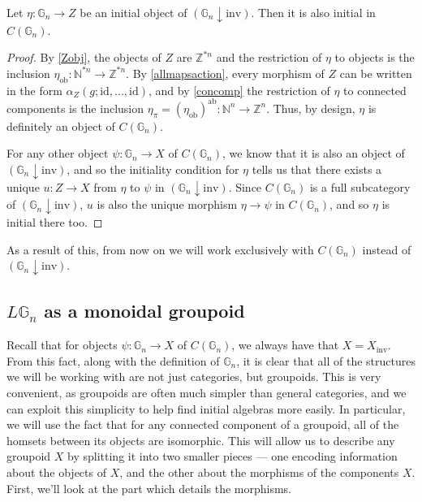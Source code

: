 \begin{lem}\label{initialab} Let $\eta : \mathbb{G}_n \to Z$ be an initial object of $(\mathbb{G}_n \downarrow \mathrm{inv})$. Then it is also initial in $C(\mathbb{G}_n)$.
\end{lem}
\begin{proof}
By \cref{Zobj}, the objects of $Z$ are $\mathbb{Z}^{\ast n}$ and the restriction of $\eta$ to objects is the inclusion $\eta_{\mathrm{ob}} : \mathbb{N}^{\ast n} \to \mathbb{Z}^{\ast n}$. By \cref{allmapsaction}, every morphism of $Z$ can be written in the form $\alpha_Z(g; \mathrm{id}, ..., \mathrm{id})$, and by \ref{concomp} the restriction of $\eta$ to connected components is the inclusion $\eta_\pi = (\eta_{\mathrm{ob}})^{\mathrm{ab}} : \mathbb{N}^n \to \mathbb{Z}^n$. Thus, by design, $\eta$ is definitely an object of $C(\mathbb{G}_n)$. 

For any other object $\psi: \mathbb{G}_n \to X$ of $C(\mathbb{G}_n)$, we know that it is also an object of $(\mathbb{G}_n \downarrow \mathrm{inv})$, and so the initiality condition for $\eta$ tells us that there exists a unique $u : Z \to X$ from $\eta$ to $\psi$ in $(\mathbb{G}_n \downarrow \mathrm{inv})$. Since $C(\mathbb{G}_n)$ is a full subcategory of $(\mathbb{G}_n \downarrow \mathrm{inv})$, $u$ is also the unique morphism $\eta \to \psi$ in $C(\mathbb{G}_n)$, and so $\eta$ is initial there too.
\end{proof}

As a result of this, from now on we will work exclusively with $C(\mathbb{G}_n)$ instead of $(\mathbb{G}_n \downarrow \mathrm{inv})$.

\subsection{$L\mathbb{G}_n$ as a monoidal groupoid}

Recall that for objects $\psi: \mathbb{G}_n \to X$ of $C(\mathbb{G}_n)$, we always have that $X = X_{\mathrm{inv}}$. From this fact, along with the definition of $\mathbb{G}_n$, it is clear that all of the structures we will be working with are not just categories, but groupoids. This is very convenient, as groupoids are often much simpler than general categories, and we can exploit this simplicity to help find initial algebras more easily. In particular, we will use the fact that for any connected component of a groupoid, all of the homsets between its objects are isomorphic. This will allow us to describe any groupoid $X$ by splitting it into two smaller pieces --- one encoding information about the objects of $X$, and the other about the morphisms of the components $X$. First, we'll look at the part which details the morphisms.

